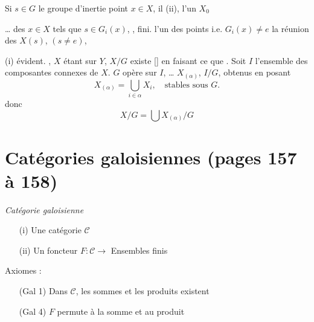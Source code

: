 \documentclass[11pt,a4paper]{article}
\begin{document}
Si $s \in G$ \struck{\ill{}} \ill{} le groupe
d'inertie \ill{} \ill{} point $x \in X$, il 
  \ill{}
(ii), \ill{} l'un $X_0$ \ill{}

\ldots{} des $x \in X$ tels que $s \in G_i(x)$, \ill{}
\ill{} \ill{}, \ill{} fini. \struck{\ill{}} \ill{} l'un des points \ill{}
i.e. $G_i(x) \neq e$ \ill{} la réunion des $X(s)$, $(s \neq e)$,

(i) \ill{} évident. \ill{} \ill{}, $X$ étant
 sur $Y$, $X/G$ existe [\ill{}]
\struck{\ill{}} \ill{} en faisant \ill{} ce que \ill{}.
Soit $I$ l'ensemble des composantes connexes de $X$.
$G$ opère sur $I$, 
\ldots{} $X_{(\alpha)}$, \struck{$\alpha \in$} $I/G$, obtenus en
posant
\[
X_{(\alpha)} = \bigcup_{i \in \alpha} X_i, \quad \text{stables sous } G.
\]
donc
\[
X/G = \bigcup X_{(\alpha)}/G
\]
\ill{}

\section*{Catégories galoisiennes (pages 157 à 158)}


\emph{Catégorie galoisienne}
\begin{enumerate}
\item[(i)] Une catégorie $\mathcal{C}$
\item[(ii)] Un foncteur $F : \mathcal{C} \to$ Ensembles finis
\end{enumerate}


Axiomes :


\begin{enumerate}
\item[(Gal 1)] Dans $\mathcal{C}$, les sommes et les produits
 existent \marginal{[d'où l'existence de $0$ et $1$]}

\item[\struck{(Gal 3)}] 

\item[(Gal 4)] $F$ permute à la somme et au produit
\end{enumerate}
\end{document}
